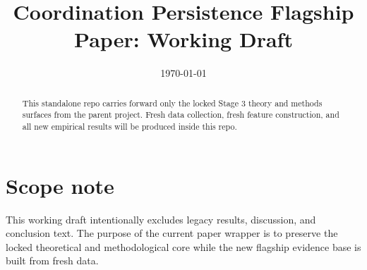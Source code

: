 \documentclass[11pt]{article}
\title{Coordination Persistence Flagship Paper: Working Draft}
\author{}
\date{\today}
\begin{document}
\maketitle

\begin{abstract}
This standalone repo carries forward only the locked Stage 3 theory and methods
surfaces from the parent project. Fresh data collection, fresh feature
construction, and all new empirical results will be produced inside this repo.
\end{abstract}

\section{Scope note}

This working draft intentionally excludes legacy results, discussion, and
conclusion text. The purpose of the current paper wrapper is to preserve the
locked theoretical and methodological core while the new flagship evidence base
is built from fresh data.




\appendix




\end{document}
